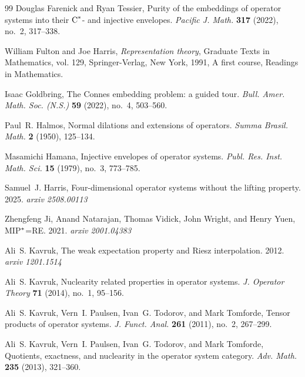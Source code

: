 \documentclass{amsart}
\theoremstyle{definition}
\theoremstyle{remark}
\numberwithin{equation}{section}
\begin{document}
\begin{thebibliography}{99}
Douglas Farenick and Ryan Tessier, Purity of the embeddings of operator
  systems into their ${\textrm C}^*$- and injective envelopes. \emph{Pacific J. Math.}
  \textbf{317} (2022), no.~2, 317--338. %

William Fulton and Joe Harris, \emph{Representation theory}, Graduate Texts in
  Mathematics, vol. 129, Springer-Verlag, New York, 1991, A first course,
  Readings in Mathematics. %

Isaac Goldbring,  The {C}onnes embedding problem: a guided tour. \emph{Bull.
  Amer. Math. Soc. (N.S.)} \textbf{59} (2022), no.~4, 503--560. %

Paul~R. Halmos,  Normal dilations and extensions of operators. \emph{Summa
  Brasil. Math.} \textbf{2} (1950), 125--134. %

Masamichi Hamana, Injective envelopes of operator systems. \emph{Publ. Res.
  Inst. Math. Sci.} \textbf{15} (1979), no.~3, 773--785. %

Samuel~J. Harris,  Four-dimensional operator systems without the lifting
  property. 2025. \emph{arxiv 2508.00113} 
  
Zhengfeng Ji, Anand Natarajan, Thomas Vidick, John Wright, and Henry Yuen,
{MIP}{${}\sp*$}={RE}. 2021. \emph{arxiv 2001.04383}

Ali~S. Kavruk, The weak expectation property and {R}iesz interpolation. 2012.
\emph{arxiv 1201.1514}

Ali~S. Kavruk, Nuclearity related properties in operator systems. \emph{J. Operator
  Theory} \textbf{71} (2014), no.~1, 95--156. %

Ali~S. Kavruk, Vern~I. Paulsen, Ivan~G. Todorov, and Mark Tomforde,
Tensor products of operator systems. \emph{J. Funct. Anal.} \textbf{261}
  (2011), no.~2, 267--299. %

Ali~S. Kavruk, Vern~I. Paulsen, Ivan~G. Todorov, and Mark Tomforde, 
Quotients, exactness, and nuclearity in the operator system
  category. \emph{ Adv. Math.} \textbf{235} (2013), 321--360. %


\end{thebibliography}
\end{document}

